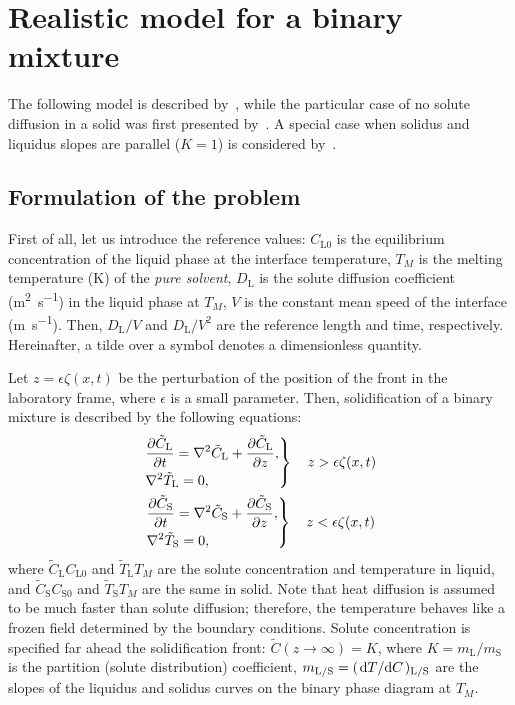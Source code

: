 \documentclass{article}
\newcommand{\liq}{\text{L}}
\newcommand{\sol}{\text{S}}
\begin{document}
\section{Realistic model for a binary mixture}

The following model is described by~\textcite{caroli1982emergence},
while the particular case of no solute diffusion in a solid was first presented by~\textcite{wollkind1970nonlinear}.
A special case when solidus and liquidus slopes are parallel ($K=1$) is considered by~\textcite{langer1977studies}.

\subsection{Formulation of the problem}

First of all, let us introduce the reference values:
$C_{\liq0}$ is the equilibrium concentration of the liquid phase at the interface temperature,
$T_M$ is the melting temperature (\si{\K}) of the \emph{pure solvent},
$D_\liq$ is the solute diffusion coefficient (\si{\m\squared\per\s}) in the liquid phase at $T_M$,
$V$ is the constant mean speed of the interface (\si{\m\per\s}).
Then, $D_\liq/V$ and $D_\liq/V^2$ are the reference length and time, respectively.
Hereinafter, a tilde over a symbol denotes a dimensionless quantity.

Let $z = \epsilon\zeta(x,t)$ be the perturbation of the position of the front in the laboratory frame,
where $\epsilon$ is a small parameter.
Then, solidification of a binary mixture is described by the following equations:
\begin{gather}
    \left.\begin{aligned}
        &\pdv{\tilde{C}_\liq}{t} = \nabla^2 \tilde{C}_\liq + \pdv{\tilde{C}_\liq}{z}, \\
        &\nabla^2 \tilde{T}_\liq = 0,
    \end{aligned}\right\} \quad z > \epsilon\zeta(x,t) \label{eq:governingL}\\
    \left.\begin{aligned}
        &\pdv{\tilde{C}_\sol}{t} = \nabla^2 \tilde{C}_\sol + \pdv{\tilde{C}_\sol}{z}, \\
        &\nabla^2 \tilde{T}_\sol = 0,
    \end{aligned}\right\} \quad z < \epsilon\zeta(x,t) \label{eq:governingS}
\end{gather}
where $\tilde{C}_\liq C_{\liq0}$ and $\tilde{T}_\liq T_M$ are the solute concentration and temperature in liquid,
and $\tilde{C}_\sol C_{\sol0}$ and $\tilde{T}_\sol T_M$ are the same in solid.
Note that heat diffusion is assumed to be much faster than solute diffusion;
therefore, the temperature behaves like a frozen field determined by the boundary conditions.
Solute concentration is specified far ahead the solidification front: $\tilde{C}(z\to\infty) = K$,
where $K = m_\liq/m_\sol$ is the partition (solute distribution) coefficient,
$m_{\liq/\sol} = (\dv*{T}{C})_{\liq/\sol}$ are the slopes of the liquidus and solidus curves
on the binary phase diagram at $T_M$.
\end{document}
